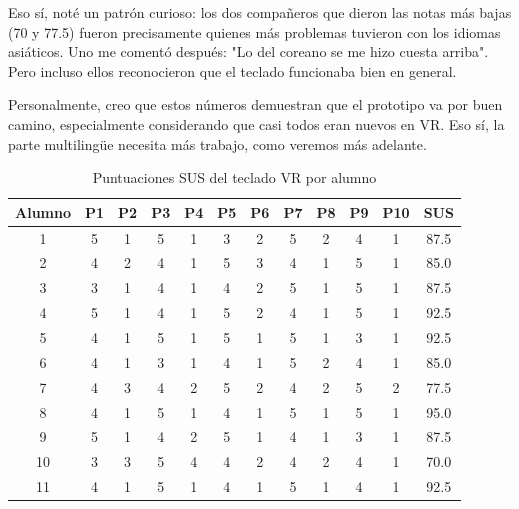 Eso sí, noté un patrón curioso: los dos compañeros que dieron las notas más bajas (70 y 77.5) fueron precisamente quienes más problemas tuvieron con los idiomas asiáticos. Uno me comentó después: "Lo del coreano se me hizo cuesta arriba". Pero incluso ellos reconocieron que el teclado funcionaba bien en general.

Personalmente, creo que estos números demuestran que el prototipo va por buen camino, especialmente considerando que casi todos eran nuevos en VR. Eso sí, la parte multilingüe necesita más trabajo, como veremos más adelante.

\begin{table}[H]
	\centering
	\caption{Puntuaciones SUS del teclado VR por alumno}
	\label{tab:sus_scores}
	\begin{tabular}{cccccccccccc}
		\toprule
		\textbf{Alumno} & \textbf{P1} & \textbf{P2} & \textbf{P3} & \textbf{P4} & \textbf{P5} & \textbf{P6} & \textbf{P7} & \textbf{P8} & \textbf{P9} & \textbf{P10} & \textbf{SUS} \\
		\midrule
		1  & 5 & 1 & 5 & 1 & 3 & 2 & 5 & 2 & 4 & 1 & 87.5 \\
		2  & 4 & 2 & 4 & 1 & 5 & 3 & 4 & 1 & 5 & 1 & 85.0 \\
		3  & 3 & 1 & 4 & 1 & 4 & 2 & 5 & 1 & 5 & 1 & 87.5 \\
		4  & 5 & 1 & 4 & 1 & 5 & 2 & 4 & 1 & 5 & 1 & 92.5 \\
		5  & 4 & 1 & 5 & 1 & 5 & 1 & 5 & 1 & 3 & 1 & 92.5 \\
		6  & 4 & 1 & 3 & 1 & 4 & 1 & 5 & 2 & 4 & 1 & 85.0 \\
		7  & 4 & 3 & 4 & 2 & 5 & 2 & 4 & 2 & 5 & 2 & 77.5 \\
		8  & 4 & 1 & 5 & 1 & 4 & 1 & 5 & 1 & 5 & 1 & 95.0 \\
		9  & 5 & 1 & 4 & 2 & 5 & 1 & 4 & 1 & 3 & 1 & 87.5 \\
		10 & 3 & 3 & 5 & 4 & 4 & 2 & 4 & 2 & 4 & 1 & 70.0 \\
		11 & 4 & 1 & 5 & 1 & 4 & 1 & 5 & 1 & 4 & 1 & 92.5 \\
		\bottomrule
	\end{tabular}
\end{table}

